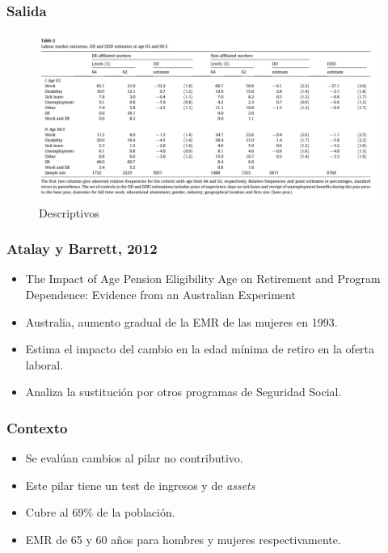 \documentclass{beamer}
\begin{document}
    \frame
    {
    \frametitle{Salida}
    
    \begin{figure}[htp]
      \centering
      \includegraphics[width=14cm]{imgs/vestad-tbl2}
      \caption{Descriptivos}
      \label{fig:fig2}
    \end{figure}
    }
              \frame
              {
                \frametitle{Atalay y Barrett, 2012}
                  \begin{itemize}
                  \item The Impact of Age Pension Eligibility Age on Retirement and Program Dependence: Evidence from an Australian Experiment
                  \item Australia, aumento gradual de la EMR de las mujeres en 1993.
                  \item Estima el impacto del cambio en la edad mínima de retiro en la oferta laboral.
                  \item Analiza la sustitución por otros programas de Seguridad Social.
                  \end{itemize}
              }
              \frame
              {
                \frametitle{Contexto}
                  \begin{itemize}
                  \item Se evalúan cambios al pilar no contributivo.
                  \item Este pilar tiene un test de ingresos y de \textit{assets}
                  \item Cubre al 69\% de la población.
                  \item EMR de 65 y 60 años para hombres y mujeres respectivamente.
                  \end{itemize}
               } 
\end{document}
